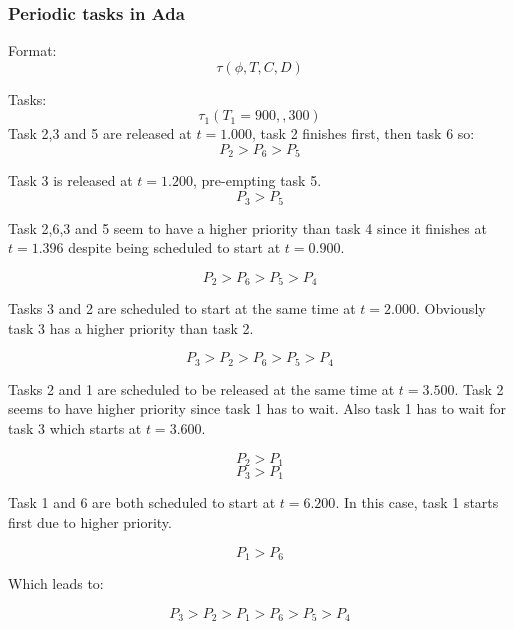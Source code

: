 \setcounter{section}{3}
\setcounter{subsection}{3}
\setcounter{subsubsection}{0}

\subsubsection{Periodic tasks in Ada}


Format:
\[\tau(\phi, T, C, D)\]

Tasks:
\[\tau_1(T_1 = 900, , 300)\]
Task 2,3 and 5 are released at $t = 1.000$, task 2 finishes first, then task 6 so:
\[P_2 > P_6 > P_5\]

Task 3 is released at $t = 1.200$, pre-empting task 5.
\[P_3 > P_5\]

Task 2,6,3 and 5 seem to have a higher priority than task 4 since it finishes at $t = 1.396$ despite being scheduled to start at $t = 0.900$.

\[P_2 > P_6 > P_5 > P_4\]


Tasks 3 and 2 are scheduled to start at the same time at $t = 2.000$. Obviously task 3 has a higher priority than task 2.

\[P_3 > P_2 > P_6 > P_5 > P_4\]

Tasks 2 and 1 are scheduled to be released at the same time at $t = 3.500$. Task 2 seems to have higher priority since task 1 has to wait. Also task 1 has to wait for task 3 which starts at $t = 3.600$.

\[P_2 > P_1\]
\[P_3 > P_1\]

Task 1 and 6 are both scheduled to start at $t = 6.200$. In this case, task 1 starts first due to higher priority.

\[P_1 > P_6\]

Which leads to:

\[P_3 > P_2 > P_1 > P_6 > P_5 > P_4\]
